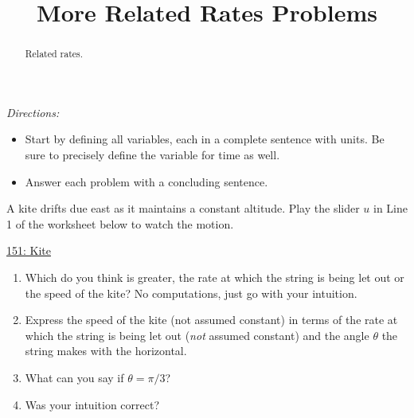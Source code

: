 \documentclass{ximera}
\title{More Related Rates Problems}
\begin{document}
\begin{abstract}
Related rates.
\end{abstract}
\maketitle


\emph{Directions:}
\begin{itemize}
\item Start by defining all variables, each in a complete sentence with units. Be sure to precisely define the variable for time as well.

\item Answer each problem with a concluding sentence.
\end{itemize}

\begin{question} \label{Q9oigohonn}
A kite drifts due east as it maintains a constant altitude. Play the slider $u$ in Line 1 of the worksheet below to watch the motion.

 
\begin{onlineOnly}
   \begin{center}
\end{center}
\end{onlineOnly}

\href{https://www.desmos.com/calculator/qdrzdt4erc}{151: Kite}

\begin{enumerate}
\item Which do you think is greater, the rate at which the string is being let out or the speed of the kite? No computations, just go with your intuition.

\item Express the speed of the kite (not assumed constant) in terms of the rate at which the string is being let out (\emph{not} assumed constant) and the angle $\theta$ the string makes with the horizontal.

\item What can you say if $\theta =  \pi/3$?

\item Was your intuition correct?
\end{enumerate}



\end{question}
\end{document}
